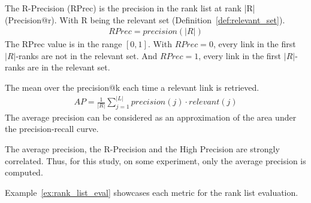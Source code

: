 \begin{definition}
  The R-Precision (RPrec) is the precision in the rank list at rank |R| (Precision@r).
  With R being the relevant set (Definition~\ref{def:relevant_set}).
  \begin{gather*}
    RPrec = precision(|R|)
  \end{gather*}
  The RPrec value is in the range $\left[0, 1\right]$.
  With $RPrec=0$, every link in the first $|R|$-ranks are not in the relevant set.
  And $RPrec=1$, every link in the first $|R|$-ranks are in the relevant set.
\end{definition}

\begin{definition}
  The mean over the precision@k each time a relevant link is retrieved.
  \begin{gather*}
    AP = \frac{1}{|R|} \sum_{j=1}^{|L|} precision(j) \cdot relevant(j)
  \end{gather*}
  The average precision can be considered as an approximation of the area under the precision-recall curve.
\end{definition}

The average precision, the R-Precision and the High Precision are strongly correlated.
Thus, for this study, on some experiment, only the average precision is computed.

Example~\ref{ex:rank_list_eval} showcases each metric for the rank list evaluation.

